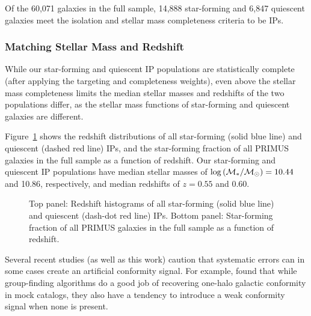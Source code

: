 Of the 60,071 galaxies in the full sample, 14,888 star-forming and 6,847 quiescent galaxies meet the isolation and stellar mass completeness criteria to be IPs.



\subsubsection{Matching Stellar Mass and Redshift}\label{sec:IPsample_matching}

While our star-forming and quiescent IP populations are statistically complete (after applying the targeting and completeness weights), even above the stellar mass completeness limits the median stellar masses and redshifts of the two populations differ, as the stellar mass functions of star-forming and quiescent galaxies are different.

Figure~\ref{fig:IPhist_latefrac_vs_z} shows the redshift distributions of all star-forming (solid blue line) and quiescent (dashed red line) IPs, and the star-forming fraction of all PRIMUS galaxies in the full sample as a function of redshift.
Our star-forming and quiescent IP populations have median stellar masses of $\logM=10.44$ and 10.86, respectively, and median redshifts of $z=0.55$ and 0.60.

\begin{figure}
  \epstrim{0.1in 0.1in 0.5in 0.8in}
  \caption{Top panel: Redshift histograms of all star-forming (solid blue line) and quiescent (dash-dot red line) IPs.
Bottom panel: Star-forming fraction of all PRIMUS galaxies in the full sample as a function of redshift. 
}
  \label{fig:IPhist_latefrac_vs_z}
\end{figure}

Several recent studies (as well as this work) caution that systematic errors can in some cases create an artificial conformity signal.
For example, \citet{Campbell15} found that while group-finding algorithms do a good job of recovering one-halo galactic conformity in mock catalogs, they also have a tendency to introduce a weak conformity signal when none is present.

